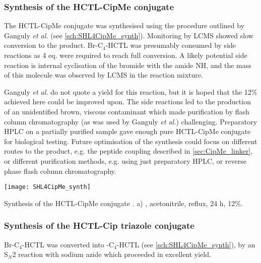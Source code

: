 \subsubsection{Synthesis of the HCTL-CipMe conjugate }

The HCTL-CipMe conjugate  was synthesised using the procedure outlined by Ganguly \textit{et al.}\cite{Ganguly2011} (see \ref{sch:SHL4CipMe_synth}). Monitoring by LCMS showed slow conversion to the product. Br-C$_4$-HCTL  was presumably consumed by side reactions as 4 eq. were required to reach full conversion. 
A likely potential side reaction is internal cyclisation of the bromide with the amide NH, and the mass of this molecule was observed by LCMS in the reaction mixture.

Ganguly \textit{et al.} do not quote a yield for this reaction\cite{Ganguly2011,Iyer2012}, but it is hoped that the 12\% achieved here could be improved upon. The side reactions led to the production of an unidentified brown, viscous contaminant which made purification by flash column chromatography (as was used by Ganguly \textit{et al.}) challenging. Preparatory HPLC on a partially purified sample gave enough pure HCTL-CipMe conjugate  for biological testing. Future optimisation of the synthesis could focus on different routes to the product, e.g. the peptide coupling described in \ref{sec:CipMe_linker}, or different purification methods, e.g. using just preparatory HPLC, or reverse phase flash column chromatography.



\begin{scheme}[H]
	\begin{center}
		\texttt{[image: SHL4CipMe\_synth]}
		\caption{
			Synthesis of the HCTL-CipMe conjugate .
			a) , acetonitrile, reflux, 24 h, 12\%.
			\label{sch:SHL4CipMe_synth}}
	\end{center}
\end{scheme}

\subsubsection{Synthesis of the HCTL-Cip triazole conjugate }

Br-C$_4$-HCTL  was converted into -C$_4$-HCTL  (see \ref{sch:SHL4CipMe_synth}), by an S$_N$2 reaction with sodium azide which proceeded in excellent yield. 

